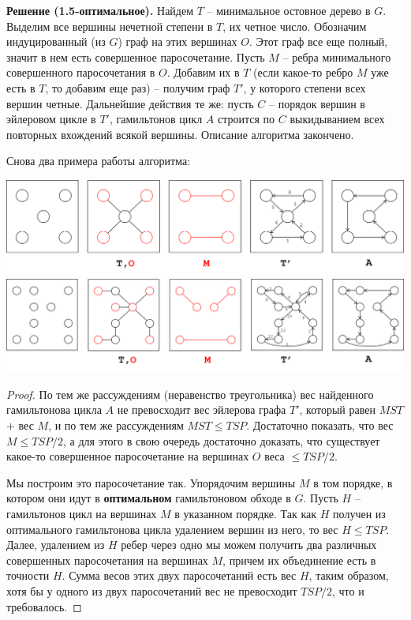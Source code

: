 \textbf{Решение (1.5-оптимальное).} Найдем $T$ -- минимальное остовное дерево в $G$. Выделим все вершины нечетной степени в $T$, их четное число. Обозначим индуцированный (из $G$) граф на этих вершинах $O$. Этот граф все еще полный, значит в нем есть совершенное паросочетание. Пусть $M$ -- ребра минимального совершенного паросочетания в $O$. Добавим их в $T$ (если какое-то ребро $M$ уже есть в $T$, то добавим еще раз) -- получим граф $T'$, у которого степени всех вершин четные. Дальнейшие действия те же: пусть $C$ -- порядок вершин в эйлеровом цикле в $T'$, гамильтонов цикл $A$ строится по $C$ выкидыванием всех повторных вхождений всякой вершины. Описание алгоритма закончено.

Снова два примера работы алгоритма:

\includegraphics[width=\textwidth]{figures/ex_shorthamil2.png} \\
\includegraphics[width=\textwidth]{figures/ex_longhamil2.png}

\begin{proof}
По тем же рассуждениям (неравенство треугольника) вес найденного гамильтонова цикла $A$ не превосходит вес эйлерова графа $T'$, который равен $MST$ $+$ вес $M$, и по тем же рассуждениям $MST \leq TSP$. Достаточно показать, что вес $M \leq TSP/2$, а для этого в свою очередь достаточно доказать, что существует какое-то совершенное паросочетание на вершинах $O$ веса $\leq TSP/2$. 

Мы построим это паросочетание так. Упорядочим вершины $M$ в том порядке, в котором они идут в \textbf{оптимальном} гамильтоновом обходе в $G$. Пусть $H$ -- гамильтонов цикл на вершинах $M$ в указанном порядке. Так как $H$ получен из оптимального гамильтонова цикла удалением вершин из него, то вес $H \leq TSP$. Далее, удалением из $H$ ребер через одно мы можем получить два различных совершенных паросочетания на вершинах $M$, причем их объединение есть в точности $H$. Сумма весов этих двух паросочетаний есть вес $H$, таким образом, хотя бы у одного из двух паросочетаний вес не превосходит $TSP/2$, что и требовалось.
\end{proof}
